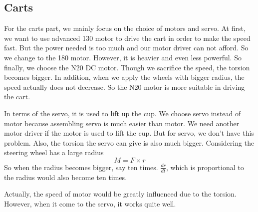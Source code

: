 \subsection{Carts}
For the carts part, we mainly focus on the choice of motors and servo. At first, we want to use advanced 130 motor to drive the cart in order to make the speed fast. But the power needed is too much and our motor driver can not afford. So we change to the 180 motor. However, it is heavier and even less powerful. So finally, we choose the N20 DC motor. Though we sacrifice the speed, the torsion becomes bigger. In addition, when we apply the wheels with bigger radius, the speed actually does not decrease. So the N20 motor is more suitable in driving the cart.
\par
In terms of the servo, it is used to lift up the cup. We choose servo instead of motor because assembling servo is much easier than motor. We need another motor driver if the motor is used to lift the cup. But for servo, we don’t have this problem. Also, the torsion the servo can give is also much bigger. Considering the steering wheel has a large radius
$$M=F\times r$$
So when the radius becomes bigger, say ten times. $\frac{dr}{dt}$, which is proportional to the radius would also become ten times. 
\par
Actually, the speed of motor would be greatly influenced due to the torsion. However, when it come to the servo, it works quite well.
